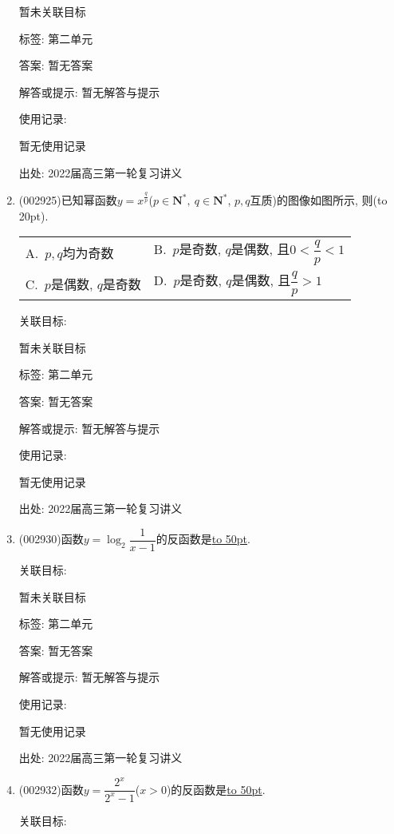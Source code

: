 \documentclass[10pt,a4paper]{article}
\newcommand{\blank}[1]{\underline{\hbox to #1pt{}}}
\newcommand{\bracket}[1]{(\hbox to #1pt{})}
\newcommand{\twoch}[4]{\par\begin{tabular}{p{.46\textwidth}p{.46\textwidth}}
A.~#1& B.~#2\\
C.~#3& D.~#4
\end{tabular}}
\begin{document}
\begin{enumerate}[1.]
暂未关联目标



标签: 第二单元

答案: 暂无答案

解答或提示: 暂无解答与提示

使用记录:

暂无使用记录


出处: 2022届高三第一轮复习讲义
\item { (002925)}已知幂函数$y=x^{\frac qp}$($p\in \mathbf{N}^*,\ q\in \mathbf{N}^*$, $p,q$互质)的图像如图所示, 则\bracket{20}.
\begin{center}
\end{center}
\twoch{$p,q$均为奇数}{$p$是奇数, $q$是偶数, 且$0<\dfrac qp<1$}{$p$是偶数, $q$是奇数}{$p$是奇数, $q$是偶数, 且$\dfrac qp>1$}


关联目标:

暂未关联目标



标签: 第二单元

答案: 暂无答案

解答或提示: 暂无解答与提示

使用记录:

暂无使用记录


出处: 2022届高三第一轮复习讲义
\item { (002930)}函数$y=\log_2 \dfrac 1{x-1}$的反函数是\blank{50}.


关联目标:

暂未关联目标



标签: 第二单元

答案: 暂无答案

解答或提示: 暂无解答与提示

使用记录:

暂无使用记录


出处: 2022届高三第一轮复习讲义
\item { (002932)}函数$y=\dfrac{2^x}{{2^x}-1}$($x>0$)的反函数是\blank{50}.


关联目标:


\end{enumerate}
\end{document}
